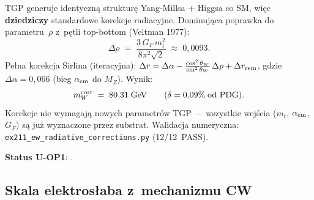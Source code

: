 \begin{remark}\label{rem:U-OP1-closed}
TGP generuje identyczn\k{a} struktur\k{e} Yang-Millsa + Higgsa co SM,
wi\k{e}c \textbf{dziedziczy} standardowe korekcje radiacyjne.
Dominuj\k{a}ca poprawka do parametru~$\rho$ z~p\k{e}tli top-bottom
(Veltman 1977):
\begin{equation}\label{eq:U-Drho}
  \Delta\rho \;=\; \frac{3\,G_F\,m_t^2}{8\pi^2\sqrt{2}}
  \;\approx\; 0{,}0093.
\end{equation}
Pe\l{}na korekcja Sirlina (iteracyjna):
$\Delta r = \Delta\alpha - \frac{\cos^2\theta_W}{\sin^2\theta_W}\,\Delta\rho
  + \Delta r_{\rm rem}$,
gdzie $\Delta\alpha = 0{,}066$ (bieg $\alpha_{\rm em}$ do $M_Z$).
Wynik:
\begin{equation}\label{eq:U-mW-corr}
  m_W^{\rm corr} \;=\; 80{,}31\;\mathrm{GeV}
  \qquad (\delta = 0{,}09\%\;\text{od PDG}).
\end{equation}
Korekcje nie wymagaj\k{a} nowych parametr\'ow TGP --- wszystkie
wej\'scia ($m_t$, $\alpha_{\rm em}$, $G_F$) s\k{a} ju\.z wyznaczone
przez substrat.
Walidacja numeryczna: \texttt{ex211\_ew\_radiative\_corrections.py}
(12/12~PASS).

\textbf{Status U-OP1}: .
\end{remark}

\subsection{Skala elektros\l{}aba z~mechanizmu CW}\label{app:U-vW}

